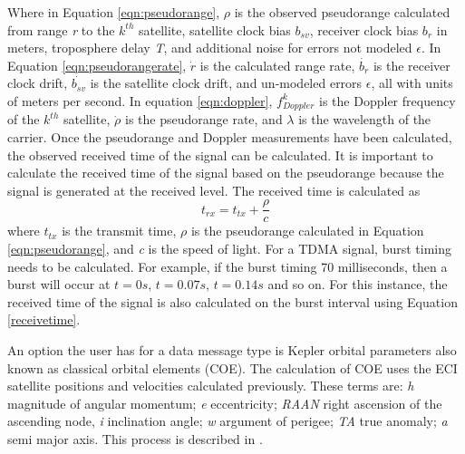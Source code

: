 \documentclass[12pt]{report}
\begin{document}
Where in Equation \ref{eqn:pseudorange}, $\rho$ is the observed pseudorange calculated from range \textit{r} to the $k^{th}$ satellite, satellite clock bias $b_{sv}$, receiver clock bias $b_{r}$ in meters, troposphere delay \textit{T},  and additional noise for errors not modeled $\epsilon$. In Equation \ref{eqn:pseudorangerate}, $\dot{r}$ is the calculated range rate, $\dot{b_r}$ is the receiver clock drift, $\dot{b_{sv}}$ is the satellite clock drift, and un-modeled errors $\epsilon$, all with units of meters per second. In equation \ref{eqn:doppler}, $f^{k}_{Doppler}$ is the Doppler frequency of the $k^{th}$ satellite, $\dot{\rho}$ is the pseudorange rate, and $\lambda$ is the wavelength of the carrier. Once the pseudorange and Doppler measurements have been calculated, the observed received time of the signal can be calculated. It is important to calculate the received time of the signal based on the pseudorange because the signal is generated at the received level. The received time is calculated as 
\begin{equation}
    t_{rx} = t_{tx} + \frac{\rho}{c}
    \label{receivetime}
\end{equation}
where $t_{tx}$ is the transmit time, $\rho$ is the pseudorange calculated in Equation \ref{eqn:pseudorange}, and \textit{c} is the speed of light. For a TDMA signal, burst timing needs to be calculated. For example, if the burst timing 70 milliseconds, then a burst will occur at $t=0s$, $t=0.07s$, $t=0.14s$ and so on. For this instance, the received time of the signal is also calculated on the burst interval using Equation \ref{receivetime}.

An option the user has for a data message type is Kepler orbital parameters also known as classical orbital elements (COE). The calculation of COE uses the ECI satellite positions and velocities calculated previously. These terms are: \textit{h} magnitude of angular momentum; \textit{e} eccentricity; \textit{RAAN} right ascension of the ascending node, \textit{i} inclination angle; \textit{w} argument of perigee; \textit{TA} true anomaly; \textit{a} semi major axis. This process is described in \cite{curtisOrbitalMechanicsEngineering2008}.
\end{document}
